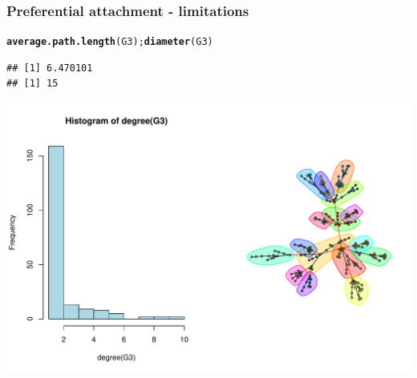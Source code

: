 \documentclass{beamer}\usepackage[]{graphicx}\usepackage[]{color}
\makeatletter
\newcommand{\hlstd}[1]{\textcolor[rgb]{0.345,0.345,0.345}{#1}}%
\newcommand{\hlkwd}[1]{\textcolor[rgb]{0.737,0.353,0.396}{\textbf{#1}}}%
\newenvironment{kframe}{%
 \def\at@end@of@kframe{}%
 \ifinner\ifhmode%
  \def\at@end@of@kframe{\end{minipage}}%
  \begin{minipage}{\columnwidth}%
 \fi\fi%
 \def\FrameCommand##1{\hskip\@totalleftmargin \hskip-\fboxsep
 \colorbox{shadecolor}{##1}\hskip-\fboxsep
     \hskip-\linewidth \hskip-\@totalleftmargin \hskip\columnwidth}%
 \MakeFramed {\advance\hsize-\width
   \@totalleftmargin\z@ \linewidth\hsize
   \@setminipage}}%
 {\par\unskip\endMakeFramed%
 \at@end@of@kframe}
\newenvironment{knitrout}{}{} %
\makeatother
\begin{document}
\begin{frame}[fragile]
  \frametitle{Preferential attachment - limitations}

\begin{knitrout}\scriptsize
{}\color{fgcolor}\begin{kframe}
\begin{alltt}
\hlkwd{average.path.length}\hlstd{(G3);} \hlkwd{diameter}\hlstd{(G3)}
\end{alltt}
\begin{verbatim}
## [1] 6.470101
## [1] 15
\end{verbatim}
\end{kframe}
\end{knitrout}

\begin{knitrout}\scriptsize
{}\color{fgcolor}
\includegraphics[width=.8\textwidth]{figures/PA_limitation2-1} 

\end{knitrout}
\end{frame}
\end{document}
